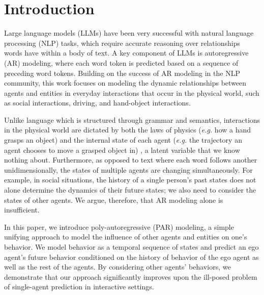 \section{Introduction}

Large language models (LLMs) have been very successful with natural language processing (NLP) tasks, which require accurate reasoning over relationships words have within a body of text. A key component of LLMs is autoregressive (AR) modeling, where each word token is predicted based on a sequence of preceding word tokens. Building on the success of AR modeling in the NLP community, this work focuses on modeling the dynamic relationships between agents and entities in everyday interactions that occur in the physical world, such as social interactions, driving, and hand-object interactions.

Unlike language which is structured through grammar and semantics, interactions in the physical world are dictated by both the laws of physics (\textit{e.g.} how a hand grasps an object) and the internal state of each agent (\textit{e.g.} the trajectory an agent chooses to move a grasped object in) , a latent variable that we know nothing about. Furthermore, as opposed to text where each word follows another unidimensionally, the states of multiple agents are changing simultaneously. For example, in social situations, the history of a single person’s past states does not alone determine the dynamics of their future states; we also need to consider the states of other agents. We argue, therefore, that AR modeling alone is insufficient. 

In this paper, we introduce poly-autoregressive (PAR) modeling, a simple unifying approach to model the influence of other agents and entities on one’s behavior. We model behavior as a temporal sequence of states and predict an ego agent’s future behavior conditioned on the history of behavior of the ego agent as well as the rest of the agents. By considering other agents’ behaviors, we demonstrate that our approach significantly improves upon the ill-posed problem of single-agent prediction in interactive settings.

